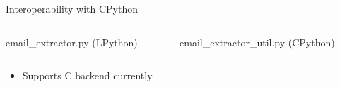 \begin{frame}{Interoperability with CPython}
    \begin{columns}
        \begin{column}{0.5\textwidth}
            \centering email\_extractor.py (LPython)
        \end{column}
        \begin{column}{0.5\textwidth}
            \centering email\_extractor\_util.py (CPython)
        \end{column}
    \end{columns}
    \begin{columns}
        \begin{column}{0.5\textwidth}
            \tiny
            
        \end{column}
        \begin{column}{0.5\textwidth}
            \tiny
            
        \end{column}
    \end{columns}
    \begin{itemize}
        \item Supports C backend currently
        \scriptsize
        
    \end{itemize}
\end{frame}